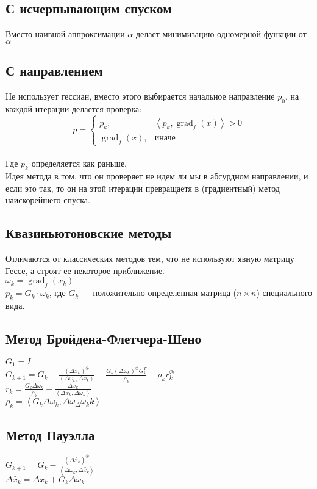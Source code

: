 \documentclass[russian, english]{article}
\newcommand{\mydot}[2]{\left\langle#1,#2\right\rangle}
\begin{document}
\subsection{С исчерпывающим спуском}
Вместо наивной аппроксимации $\alpha$ делает минимизацию одномерной функции от $\alpha$
\subsection{С направлением}
Не использует гессиан, вместо этого выбирается начальное направление $p_0$, на каждой итерации делается проверка:\\
$$
p = \begin{cases}
	p_k, & \mydot{p_k}{\operatorname{grad}_f(x)} > 0\\
	\operatorname{grad}_f(x), & \text{иначе}
\end{cases}
$$\\
Где $p_k$ определяется как раньше. \\
Идея метода в том, что он проверяет не идем ли мы в абсурдном направлении, и если это так, то он на этой итерации превращаетя в (градиентный) метод наискорейшего спуска.
\subsection{Квазиньютоновские методы}
Отличаются от классических методов тем, что не используют явную матрицу Гессе, а строят ее некоторое приближение.\\
$\omega_k = \operatorname{grad}_f(x_k)$\\
$p_k=G_k\cdot\omega_k$, где $G_k$ --- положительно определенная матрица ($n\times n$) специального вида.
\subsection{Метод Бройдена-Флетчера-Шено}
$G_1 = I$\\
$G_{k+1}=G_k - \frac{(\Delta x_k)^\otimes}{\mydot{\Delta \omega_k}{\Delta x_k}} - \frac{G_k(\Delta\omega_k)^\otimes G_k^T}{\rho_k}+\rho_k r_k^\otimes$\\
$r_k=\frac{G_k\Delta\omega_k}{\rho_k}-\frac{\Delta x_k}{\mydot{\Delta x_k}{\Delta\omega_k}}$\\
$\rho_k=\mydot{G_k\Delta\omega_k}{\Delta\omega_\Delta\omega_kk}$
\subsection{Метод Пауэлла}
$G_{k+1}=G_k-\frac{(\Delta \widetilde{x_k})^\otimes}{\mydot{\Delta\omega_k}{\Delta\widetilde{x_k}}}$\\
$\Delta \widetilde{x_k} = \Delta x_k + G_k\Delta\omega_k$
\end{document}
